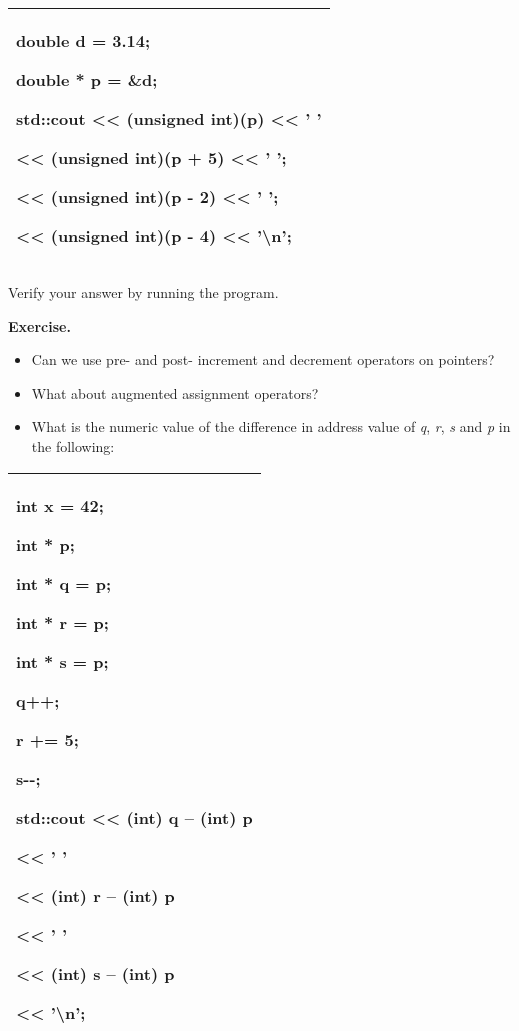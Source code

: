 \documentclass[
]{article}
\providecommand{\tightlist}{%
  \setlength{\itemsep}{0pt}\setlength{\parskip}{0pt}}
\begin{document}
\begin{longtable}[]{@{}l@{}}
\toprule
\endhead
\begin{minipage}[t]{0.97\columnwidth}\raggedright
double d = 3.14;

double * p = \&d;

std::cout \textless\textless{} (unsigned int)(p) \textless\textless{} '
'

\textless\textless{} (unsigned int)(p + 5) \textless\textless{} ' ';

\textless\textless{} (unsigned int)(p - 2) \textless\textless{} ' ';

\textless\textless{} (unsigned int)(p - 4) \textless\textless{}
'\textbackslash n'; \strut
\end{minipage}\tabularnewline
\bottomrule
\end{longtable}

Verify your answer by running the program.

\textbf{Exercise.}

\begin{itemize}
\tightlist
\item
  Can we use pre- and post- increment and decrement operators on
  pointers?
\item
  What about augmented assignment operators?
\item
  What is the numeric value of the difference in address value of
  \emph{q}, \emph{r}, \emph{s} and \emph{p} in the following:
\end{itemize}

\begin{longtable}[]{@{}l@{}}
\toprule
\endhead
\begin{minipage}[t]{0.97\columnwidth}\raggedright
int x = 42;

int * p;

int * q = p;

int * r = p;

int * s = p;

q++;

r += 5;

s-\/-;

std::cout \textless\textless{} (int) q -- (int) p

\textless\textless{} ' '

\textless\textless{} (int) r -- (int) p

\textless\textless{} ' '

\textless\textless{} (int) s -- (int) p

\textless\textless{} '\textbackslash n';\strut
\end{minipage}\tabularnewline
\bottomrule
\end{longtable}
\end{document}
